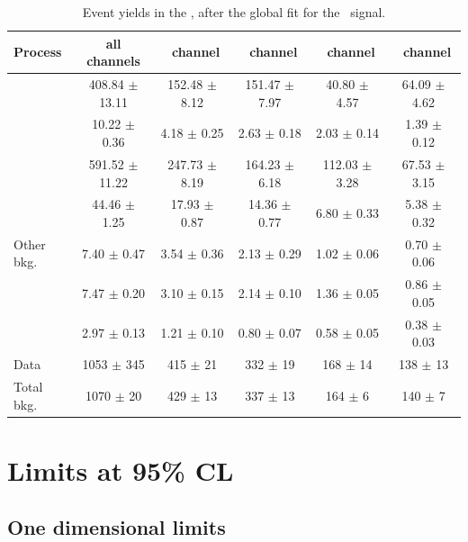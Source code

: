 \begin{landscape}
	\vspace*{\fill}
	\begin{table}[htbp]
		\centering
		\caption{Event yields  in the \WZCR, after the global fit for the \Zut\ signal.  }	
		\begin{tabular} {l c c c c c  }
			\toprule
			Process & all channels & \mumumu\ channel & \emumu\ channel & \eemu\ channel &\eee\ channel \\
			\midrule
			\NPL\ \DY  & 408.84 $ \pm $ 13.11 & 152.48 $\pm$ 8.12 &151.47 $\pm$ 7.97 & 40.80 $\pm$ 4.57 & 64.09 $\pm$ 4.62 \\ 
			\ttZ    	& 10.22 $ \pm $ 0.36  &  4.18 $\pm$  0.25 &  2.63 $\pm$ 0.18 &   2.03 $\pm$ 0.14 &  1.39 $\pm$ 0.12 \\ 
			\WZ 		& 591.52 $ \pm $ 11.22& 247.73 $\pm$ 8.19 &164.23 $\pm$ 6.18 & 112.03 $\pm$ 3.28 & 67.53 $\pm$ 3.15 \\ 
			\ZZ 		& 44.46 $ \pm $ 1.25  & 17.93 $\pm$  0.87 &14.36  $\pm$ 0.77 &   6.80 $\pm$ 0.33 & 5.38 $\pm$ 0.32 \\ 
			Other bkg. 	& 7.40 $ \pm $ 0.47   &  3.54 $\pm$  0.36 &  2.13 $\pm$ 0.29 &   1.02 $\pm$ 0.06 & 0.70 $\pm$ 0.06 \\ 
			\tZq 		& 7.47 $ \pm $ 0.20   &  3.10 $\pm$  0.15 &  2.14 $\pm$ 0.10 &   1.36 $\pm$ 0.05 & 0.86  $\pm$ 0.05 \B \\ 
			\kZut  		& 2.97 $ \pm $ 0.13   &  1.21 $\pm$  0.10 & 0.80 $\pm$ 0.07 &   0.58 $\pm$ 0.05 & 0.38 $\pm$ 0.03 \T\B\\
			\hdashline
			Data        & 1053 $ \pm $ 345 & 415 $\pm$ 21 & 332 $\pm$ 19 & 168 $\pm$ 14 & 138 $\pm$ 13 \T \\
			Total bkg.  & 1070 $ \pm $ 20 & 429 $\pm$ 13 & 337 $\pm$ 13 & 164 $\pm$ 6 & 140 $\pm$ 7 \\
			\bottomrule
		\end{tabular}
		\label{tab:PYieldWZCR}
	\end{table}
	\vspace*{\fill}
\end{landscape}
\newpage
\section{Limits at 95\% CL}
\label{sec:limits}
\subsection{One dimensional limits}

